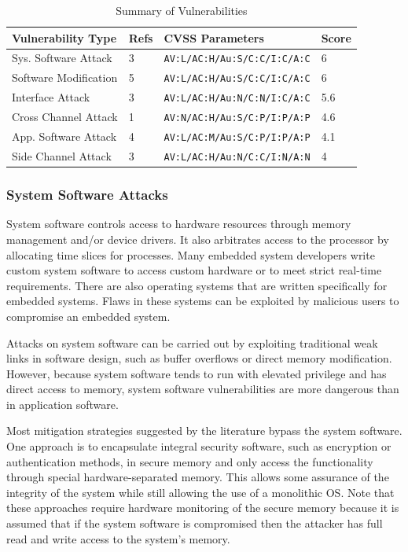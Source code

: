 \documentclass[final,conference,11pt]{IEEEtran}
\begin{document}
\begin{table}[!t]
\renewcommand{\arraystretch}{1.3}
\caption{Summary of Vulnerabilities}
\label{tab:vul_summary}
\tiny
\centering
\begin{tabular}{ | l | l | l | l | }
\hline
 Vulnerability Type & Refs & CVSS Parameters & Score \\ \hline
 Sys. Software Attack	& 3 &	\verb|AV:L/AC:H/Au:S/C:C/I:C/A:C| 	& 6		\\ \hline
 Software Modification	& 5 &	\verb|AV:L/AC:H/Au:S/C:C/I:C/A:C|	& 6		\\ \hline
 Interface Attack		& 3	&	\verb|AV:L/AC:H/Au:N/C:N/I:C/A:C|	& 5.6	\\ \hline
 Cross Channel Attack	& 1 &	\verb|AV:N/AC:H/Au:S/C:P/I:P/A:P|	& 4.6	\\ \hline
 App. Software Attack	& 4 &	\verb|AV:L/AC:M/Au:S/C:P/I:P/A:P|	& 4.1	\\ \hline
 Side Channel Attack		& 3 &	\verb|AV:L/AC:H/Au:N/C:C/I:N/A:N|	& 4		\\ \hline
\end{tabular}
\end{table}

\subsubsection{System Software Attacks}
System software controls access to hardware resources through memory management and/or device drivers.  It also arbitrates access to the processor by allocating time slices for processes.  Many embedded system developers write custom system software to access custom hardware or to meet strict real-time requirements. There are also operating systems that are written specifically for embedded systems.  Flaws in these systems can be exploited by malicious users to compromise an embedded system.  

Attacks on system software can be carried out by exploiting traditional weak links in software design, such as buffer overflows or direct memory modification.  However, because system software tends to run with elevated privilege and has direct access to memory, system software vulnerabilities are more dangerous than in application software.  

Most mitigation strategies suggested by the literature bypass the system software.  One approach is to encapsulate integral security software, such as encryption or authentication methods, in secure memory and only access the functionality through special hardware-separated memory.\cite{Arora2012}  This allows some assurance of the integrity of the system while still allowing the use of a monolithic OS.  Note that these approaches require hardware monitoring of the secure memory because it is assumed that if the system software is compromised then the attacker has full read and write access to the system's memory.
\end{document}
